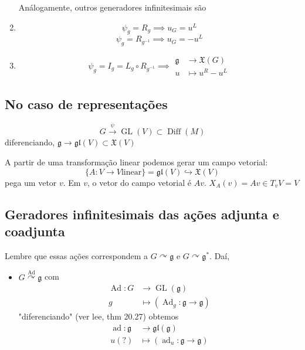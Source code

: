 \begin{example}
\begin{example}
\begin{enumerate}
	Análogamente,  outros generadores infinitesimais são

\item \[\psi_g=R_g\implies u_G=u^L\]
	\[\psi_g=R_{g ^{-1}}\implies u_G=-u^L\]
\item \[\psi_g=I_g=L_g\circ R_{g ^{-1}}\implies \begin{aligned}
	\mathfrak{g} &\longrightarrow \mathfrak{X}(G) \\
	u &\longmapsto u^R-u^L
\end{aligned} \]
	\end{enumerate}
\end{example}

\subsection{No caso de representações}
\[G \overset{\psi}{\longrightarrow}\operatorname{GL}(V)\subset \operatorname{Diff}(M)\]
diferenciando,
$\mathfrak{g} \longrightarrow \mathfrak{gl}(V) \subset \mathfrak{X}(V)$ 

A partir de uma transformação linear podemos gerar um campo vetorial:
\[\{A:V\to V \text{linear} \} =\mathfrak{gl}(V) \hookrightarrow \mathfrak{X}(V)\]
pega um vetor $v$. Em $v$, o vetor do campo vetorial  é $Av$.
$X_A(v)=Av\in T_vV=V$

\subsection{Geradores infinitesimais das ações adjunta e coadjunta}

Lembre que essas ações correspondem a $G\curvearrowright \mathfrak{g}$ e $G\curvearrowright \mathfrak{g}^*$. Daí,
\begin{itemize}
\item $G\overset{\operatorname{Ad}}{\curvearrowright }\mathfrak{g}$ com
	\begin{align*}
		\operatorname{Ad}: G &\longrightarrow \operatorname{GL}(\mathfrak{g}) \\
		g &\longmapsto (\operatorname{Ad}_g:\mathfrak{g} \to \mathfrak{g} )
	\end{align*}
	"diferenciando" (ver \cite{lee}lee, thm 20.27) obtemos
	\begin{align*}
		\operatorname{ad}: \mathfrak{g} &\longrightarrow \mathfrak{gl}(\mathfrak{g}) \\
		u(?) &\longmapsto (\operatorname{ad}_u:\mathfrak{g} \to \mathfrak{g} )
	\end{align*}
	

\end{itemize}
\end{example}
